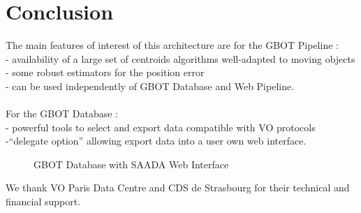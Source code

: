 \section{Conclusion}
The main features of interest of this architecture  are for the GBOT Pipeline :\\
\hspace*{0.25cm}- availability of a large set of centroids algorithms well-adapted to moving objects\\
\hspace*{0.25cm}- some robust estimators for the position error \\
\hspace*{0.25cm}- can be used independently of GBOT Database and Web Pipeline.\\\\
For the GBOT Database : \\
\hspace*{0.25cm}- powerful tools to select and export data compatible with VO protocols \\
\hspace*{0.25cm}-“delegate option” allowing export data into a user own web interface.

\begin{figure}[ht]
\caption{GBOT Database with SAADA Web Interface} \label{P03-fig-1}
\end{figure}



\acknowledgements 
We thank VO Paris Data Centre and CDS de Strasbourg for their technical and financial support.



